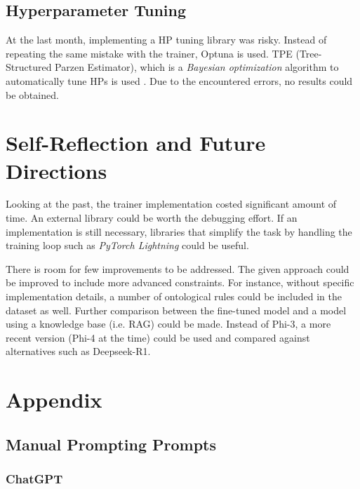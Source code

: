 \documentclass{article}
\begin{document}
\subsection{Hyperparameter Tuning}
At the last month, implementing a HP tuning library was risky. Instead of repeating the same mistake with the trainer, Optuna is used. TPE (Tree-Structured Parzen Estimator), which is a \textit{Bayesian optimization} algorithm to automatically tune HPs is used \cite{watanabe_tree-structured_2023}. Due to the encountered errors, no results could be obtained.
\section{Self-Reflection and Future Directions}

Looking at the past, the trainer implementation costed significant amount of time. An external library could be worth the debugging effort. If an implementation is still necessary, libraries that simplify the task by handling the training loop such as \textit{PyTorch Lightning} could be useful.

There is room for few improvements to be addressed. The given approach could be improved to include more advanced constraints. For instance, without specific implementation details, a number of ontological rules could be included in the dataset as well. Further comparison between the fine-tuned model and a model using a knowledge base (i.e. RAG) could be made. Instead of Phi-3, a more recent version (Phi-4 at the time) could be used and compared against alternatives such as Deepseek-R1. 

\section{Appendix}
\subsection{Manual Prompting Prompts \label{man_prompts}}
\subsubsection{ChatGPT}
\end{document}

